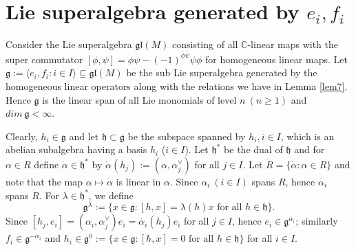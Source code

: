 \documentclass[11pt]{amsart}
\theoremstyle{plain}
\theoremstyle{definition}
\numberwithin{equation}{section}
\newcommand{\al}{\alpha}
\newcommand{\la}{\lambda}
\newcommand{\C}{\mbox{$\mathbb C$}}     %
\newcommand{\g}{\mathfrak{g}}
\newcommand{\h}{\mathfrak{h}}
\newcommand{\gl}{\mathfrak{gl}}
\begin{document}
	\section{Lie superalgebra generated by $e_i,f_i$}\label{sec4}
	Consider the Lie superalgebra $\gl(M)$ consisting of all $\C$-linear maps with the super commutator $[\phi,\psi]=\phi\psi-(-1)^{\overline{\phi}\overline{\psi}}\psi\phi$ for homogeneous linear maps. Let $\g:=\langle e_i,f_i:i\in I\rangle\subseteq\gl(M)$ be the sub Lie superalgebra generated by the homogeneous linear operators along with the relations we have in Lemma \ref{lem7}. Hence $\g$ is the linear span of all Lie monomials of level $n~(n\geq 1)$ and $dim~\g<\infty$.
	
	Clearly, $h_i\in\g$ and let $\h\subset\g$ be the subspace spanned by $h_i,i\in I$, which is an abelian subalgebra having a basis $h_i$ ($i\in I$). Let $\h^*$ be the dual of $\h$ and for $\al\in R$ define $\dot{\al}\in\h^*$ by $\dot{\al}(h_j):=(\al,\al_j^{\vee})$ for all $j\in I$. Let $\dot{R}=\{\dot{\al}:\al\in R\}$ and note that the map $\al\mapsto\dot{\al}$ is linear in $\al$. Since $\al_i~(i\in I)$ spans $R$, hence $\dot{\al_i}$ spans $\dot{R}$. For $\la\in\h^*$, we define $$\g^{\la}:=\{x\in\g:[h,x]=\la(h)x\text{ for all }h\in\h\}.$$ Since $[h_j,e_i]=(\al_i,\al_j^{\vee})e_i=\dot{\al_i}(h_j)e_i$ for all $j\in I$, hence $e_i\in\g^{\dot{\al_i}}$; similarly $f_i\in\g^{-\dot{\al_i}}$ and $h_i\in\g^0:=\{x\in\g:[h,x]=0\text{ for all }h\in\h\}$ for all $i\in I$. 
	
\end{document}
